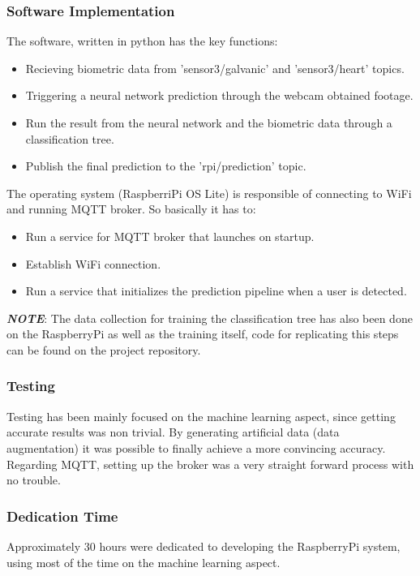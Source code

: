 \subsubsection{Software Implementation}
The software, written in python has the key functions:
\begin{itemize}
    \item Recieving biometric data from 'sensor3/galvanic' and 'sensor3/heart' topics.
    \item Triggering a neural network prediction through the webcam obtained footage.
    \item Run the result from the neural network and the biometric data through a classification tree.
    \item Publish the final prediction to the 'rpi/prediction' topic.
\end{itemize}
The operating system (RaspberriPi OS Lite) is responsible of connecting to WiFi and running MQTT broker. So basically it has to:
\begin{itemize}
    \item Run a service for MQTT broker that launches on startup.
    \item Establish WiFi connection.
    \item Run a service that initializes the prediction pipeline when a user is detected.
\end{itemize}

\textbf{\textit{NOTE}}: The data collection for training the classification tree has also been done on the RaspberryPi as well as the training itself, code for replicating this steps can be found on the project repository.

\subsubsection{Testing}
Testing has been mainly focused on the machine learning aspect, since getting accurate results was non trivial. By generating artificial data (data augmentation) it was possible to finally achieve a more convincing accuracy. Regarding MQTT, setting up the broker was a very straight forward process with no trouble.

\subsubsection{Dedication Time}
Approximately 30 hours were dedicated to developing the RaspberryPi system, using most of the time on the machine learning aspect.

